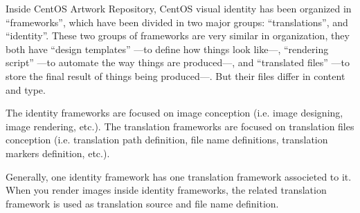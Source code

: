 
Inside CentOS Artwork Repository, CentOS visual identity has been
organized in ``frameworks'', which have been divided in two major
groups: ``translations'', and ``identity''.  These two groups of
frameworks are very similar in organization, they both have ``design
templates'' ---to define how things look like---, ``rendering script''
---to automate the way things are produced---, and ``translated
files'' ---to store the final result of things being produced---. But
their files differ in content and type.

The identity frameworks are focused on image conception (i.e.  image
designing, image rendering, etc.). The translation frameworks are
focused on translation files conception (i.e. translation path
definition, file name definitions, translation markers definition,
etc.).

Generally, one identity framework has one translation framework
associeted to it.  When you render images inside identity frameworks,
the related translation framework is used as translation source and
file name definition.

